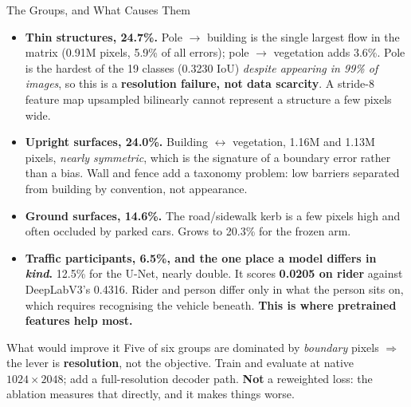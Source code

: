 \begin{frame}{The Groups, and What Causes Them}
\footnotesize
\begin{itemize}
    \item \textbf{Thin structures, 24.7\%.} Pole $\rightarrow$ building is the single largest flow
          in the matrix (0.91M pixels, 5.9\% of all errors); pole $\rightarrow$ vegetation adds
          3.6\%. Pole is the hardest of the 19 classes (0.3230 IoU) \emph{despite appearing in 99\% of
          images}, so this is a \textbf{resolution failure, not data scarcity}. A stride-8
          feature map upsampled bilinearly cannot represent a structure a few pixels wide.
    \item \textbf{Upright surfaces, 24.0\%.} Building $\leftrightarrow$ vegetation, 1.16M and
          1.13M pixels, \emph{nearly symmetric}, which is the signature of a boundary error rather than a
          bias. Wall and fence add a taxonomy problem: low barriers separated from building by
          convention, not appearance.
    \item \textbf{Ground surfaces, 14.6\%.} The road/sidewalk kerb is a few pixels high and often
          occluded by parked cars. Grows to 20.3\% for the frozen arm.
    \item \textbf{Traffic participants, 6.5\%, and the one place a model differs in \emph{kind}.}
          12.5\% for the U-Net, nearly double. It scores \textbf{0.0205 on rider} against
          DeepLabV3's 0.4316. Rider and person differ only in what the person sits on, which
          requires recognising the vehicle beneath. \textbf{This is where pretrained features
          help most.}
\end{itemize}

\begin{block}{What would improve it}
Five of six groups are dominated by \emph{boundary} pixels $\Rightarrow$ the lever is
\textbf{resolution}, not the objective. Train and evaluate at native $1024 \times 2048$; add a
full-resolution decoder path. \textbf{Not} a reweighted loss: the ablation measures that
directly, and it makes things worse.
\end{block}
\end{frame}


